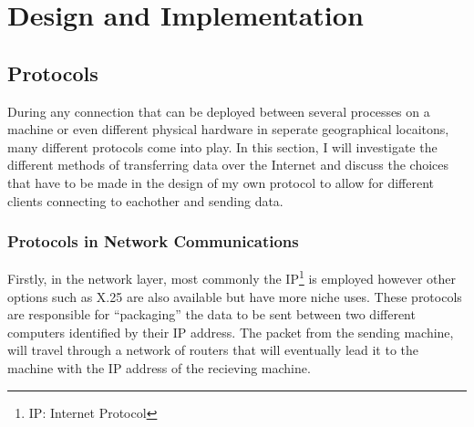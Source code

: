 \chapter{Design and Implementation}

\section{Protocols}
During any connection that can be deployed between several processes on a machine or even different physical hardware in seperate geographical locaitons, many different protocols come into play. In this section, I will investigate the different methods of transferring data over the Internet and discuss the choices that have to be made in the design of my own protocol to allow for different clients connecting to eachother and sending data.

\subsection{Protocols in Network Communications}
Firstly, in the network layer, most commonly the IP\footnote{IP: Internet Protocol} is employed however other options such as X.25 are also available but have more niche uses. These protocols are responsible for ``packaging'' the data to be sent between two different computers identified by their IP address. The packet from the sending machine, will travel through a network of routers that will eventually lead it to the machine with the IP address of the recieving machine.

